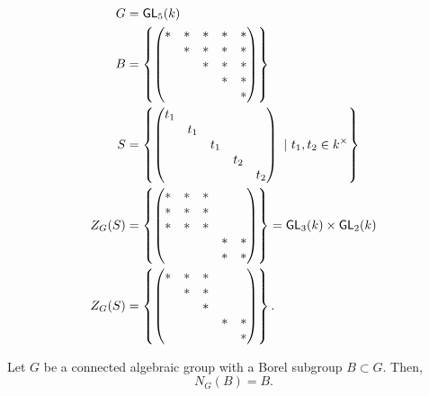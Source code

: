 \begin{example}
	\begin{align*}
	G &= \textsf{GL}_5(k)\\
	B &= \left\lbrace\left(\begin{matrix}  * & * & * & * & *\\  & * & * & * & *\\  &  & * & * & *\\  &  &  & * & *\\  &  &  &  & *  \end{matrix}\right)\right\rbrace\\
	S &= \left\lbrace\left(\begin{matrix} t_1 & & & & \\ & t_1 & & & \\ & & t_1 & & \\ & & & t_2 & \\ & & & & t_2 \end{matrix}\right) ~ | ~ t_1, t_2 \in k^\times\right\rbrace\\
	Z_G(S) &= \left\lbrace\left(\begin{matrix}  * & * & * &  & \\ * & * & * &  & \\ * & * & * &  & \\  &  &  & * & *\\  &  &  & * & * \end{matrix}\right)\right\rbrace = \textsf{GL}_3(k) \times \textsf{GL}_2(k)\\
	Z_G(S) &= \left\lbrace\left(\begin{matrix}  * & * & * &  & \\  & * & * &  & \\  &  & * &  & \\  &  &  & * & *\\  &  &  &  & * \end{matrix}\right)\right\rbrace.
	\end{align*}
\end{example}
\begin{theorem}
	Let $G$ be a connected algebraic group with a Borel subgroup $B \subset G$. Then,
	\[ N_G(B) = B. \]
\end{theorem}
